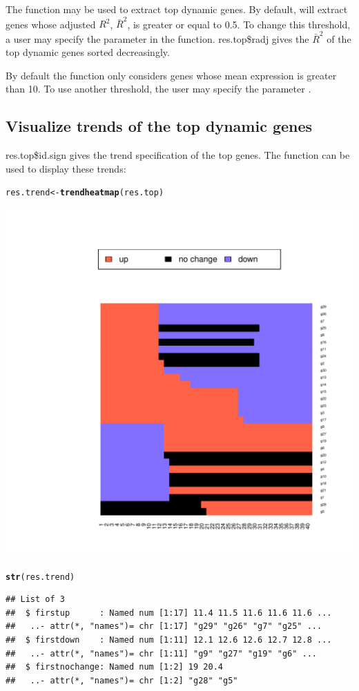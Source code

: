 \documentclass{article}\usepackage[]{graphicx}\usepackage[usenames,dvipsnames]{color}
\makeatletter
\newcommand{\hlstd}[1]{\textcolor[rgb]{0.345,0.345,0.345}{#1}}%
\newcommand{\hlkwb}[1]{\textcolor[rgb]{0.69,0.353,0.396}{#1}}%
\newcommand{\hlkwd}[1]{\textcolor[rgb]{0.737,0.353,0.396}{\textbf{#1}}}%
\newenvironment{kframe}{%
 \def\at@end@of@kframe{}%
 \ifinner\ifhmode%
  \def\at@end@of@kframe{\end{minipage}}%
  \begin{minipage}{\columnwidth}%
 \fi\fi%
 \def\FrameCommand##1{\hskip\@totalleftmargin \hskip-\fboxsep
 \colorbox{shadecolor}{##1}\hskip-\fboxsep
     \hskip-\linewidth \hskip-\@totalleftmargin \hskip\columnwidth}%
 \MakeFramed {\advance\hsize-\width
   \@totalleftmargin\z@ \linewidth\hsize
   \@setminipage}}%
 {\par\unskip\endMakeFramed%
 \at@end@of@kframe}
\newenvironment{knitrout}{}{} %
\makeatother
\begin{document}
The  function may be used to extract top dynamic genes.
By default,  will extract genes whose adjusted $R^2$, $\bar{R}^{2}$,
is greater or equal to 0.5. To change this threshold, a user may specify the
 parameter in the  function.
res.top\$radj gives the $\bar{R}^{2}$ of the top dynamic genes sorted decreasingly.


By default the  function only considers genes whose mean expression is greater than 10. 
To use another threshold, the user may specify the parameter .


\subsection{Visualize trends of the top dynamic genes}

res.top\$id.sign gives the trend specification of the top genes. The function  can be used to display these trends:

\begin{knitrout}
\color{fgcolor}\begin{kframe}
\begin{alltt}
\hlstd{res.trend} \hlkwb{<-} \hlkwd{trendheatmap}\hlstd{(res.top)}
\end{alltt}
\end{kframe}

{\centering \includegraphics[width=.6\textwidth]{figure/unnamed-chunk-6-1} 

}


\begin{kframe}\begin{alltt}
\hlkwd{str}\hlstd{(res.trend)}
\end{alltt}
\begin{verbatim}
## List of 3
##  $ firstup      : Named num [1:17] 11.4 11.5 11.6 11.6 11.6 ...
##   ..- attr(*, "names")= chr [1:17] "g29" "g26" "g7" "g25" ...
##  $ firstdown    : Named num [1:11] 12.1 12.6 12.6 12.7 12.8 ...
##   ..- attr(*, "names")= chr [1:11] "g9" "g27" "g19" "g6" ...
##  $ firstnochange: Named num [1:2] 19 20.4
##   ..- attr(*, "names")= chr [1:2] "g28" "g5"
\end{verbatim}
\end{kframe}
\end{knitrout}
\end{document}
